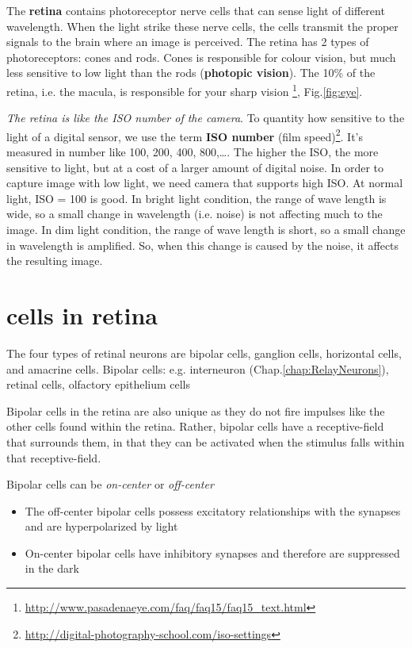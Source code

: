 The {\bf retina} contains photoreceptor nerve cells that can sense light of
different wavelength. When the light strike these nerve cells, the cells transmit the
proper signals to the brain where an image is perceived. The retina has 2 types
of photoreceptors: cones and rods. Cones is responsible for colour vision, but
much less sensitive to low light than the rods ({\bf photopic vision}). The 10\%
of the retina, i.e.
the macula, is responsible for your sharp vision
\footnote{\url{http://www.pasadenaeye.com/faq/faq15/faq15_text.html}},
Fig.\ref{fig:eye}.


{\it The retina is like the ISO number of the camera}. To quantity how sensitive
to the light of a digital sensor, we use the term {\bf ISO number} (film
speed)\footnote{\url{http://digital-photography-school.com/iso-settings}}. It's
measured in number like 100, 200, 400, 800,\ldots. The higher the ISO, the more
sensitive to light, but at a cost of a larger amount of digital noise. In order
to capture image with low light, we need camera that supports high ISO. At
normal light, ISO = 100 is good. In bright light condition,
the range of wave length is wide, so a small change in wavelength (i.e. noise)
is not affecting much to the image. In dim light condition, the range of wave
length is short, so a small change in wavelength is amplified. So, when this
change is caused by the noise, it affects the resulting image.

\section{cells in retina}
\label{sec:retina-cells}


The four types of retinal neurons are bipolar cells, ganglion cells, horizontal
cells, and amacrine cells. Bipolar cells: e.g. interneuron
(Chap.\ref{chap:RelayNeurons}), retinal cells, olfactory epithelium cells

Bipolar cells in the retina  are also unique as they do not fire impulses like
the other cells found within the retina. Rather, bipolar cells have a
receptive-field that surrounds them, in that they can be activated when 
the stimulus falls within that receptive-field.

Bipolar cells can be {\it on-center} or {\it off-center}
\begin{itemize}
  \item  The off-center bipolar cells possess excitatory relationships with the
  synapses and are hyperpolarized by light
  \item On-center bipolar cells have inhibitory synapses and therefore are
  suppressed in the dark
\end{itemize}

